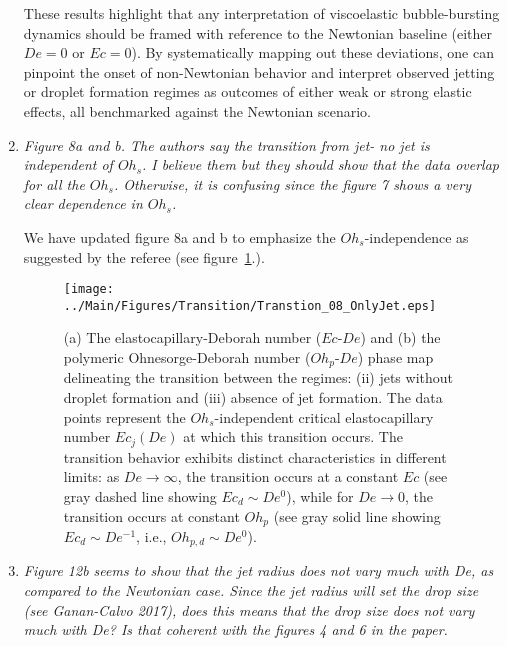 \documentclass[]{article}
\newcommand{\sos}[1]{\todo[color=red, bordercolor=none, textcolor=white]{SOS}\textcolor{red}{#1}}
\newcommand{\oo}{\color{magenta} \normalfont}
\newcommand{\bb}{\color{black} \normalfont}
\begin{document}
\begin{enumerate}
        These results highlight that any interpretation of viscoelastic bubble-bursting dynamics should be framed with reference to the Newtonian baseline (either $De = 0$ or $Ec = 0$). By systematically mapping out these deviations, one can pinpoint the onset of non-Newtonian behavior and interpret observed jetting or droplet formation regimes as outcomes of either weak or strong elastic effects, all benchmarked against the Newtonian scenario.
        \bb


       \item \textit{Figure 8a and b. The authors say the transition from jet- no jet is independent of $Oh_s$. I believe them but they should show that the data overlap for all the $Oh_s$. Otherwise, it is confusing since the figure 7 shows a very clear dependence in $Oh_s$.}

      We have updated figure 8a and b to emphasize the $Oh_s$-independence as suggested by the referee (see figure~\ref{fig:transitionJets}.).

      \begin{figure}
      	\centering
      	\texttt{[image: ../Main/Figures/Transition/Transtion\_08\_OnlyJet.eps]}
      	\caption{{\oo (a) The elastocapillary-Deborah number ($Ec$-$De$) and (b) the polymeric Ohnesorge-Deborah number ($Oh_p$-$De$) phase map delineating the transition between the regimes: (ii) jets without droplet formation and (iii) absence of jet formation. The data points represent the $Oh_s$-independent critical elastocapillary number $Ec_j(De)$ at which this transition occurs. The transition behavior exhibits distinct characteristics in different limits: as $De \to \infty$, the transition occurs at a constant $Ec$ (see gray dashed line showing $Ec_d \sim De^0$), while for $De \to 0$, the transition occurs at constant $Oh_p$ (see gray solid line showing $Ec_d \sim De^{-1}$, i.e., $Oh_{p,d} \sim De^0$).\bb}}
      	\label{fig:transitionJets}
      \end{figure}

      \item \textit{Figure 12b seems to show that the jet radius does not vary much with De, as compared to the Newtonian case. Since the jet radius will set the drop size (see Ganan-Calvo 2017), does this means that the drop size does not vary much with De? Is that coherent with the figures 4 and 6 in the paper.}


\end{enumerate}
\end{document}
